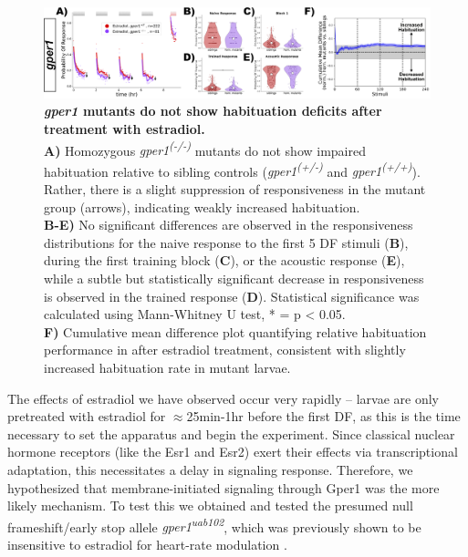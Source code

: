 \documentclass[9pt,lineno]{RandlettLab_elife}
\begin{document}
{\begin{figure}
\begin{fullwidth}
\begin{center}
\includegraphics[width=0.95\linewidth]{figures/gper1Mutants.png}
\caption{\textbf{\emph{gper1} mutants do not show habituation deficits after treatment with estradiol.}
\\ \textbf{A)} Homozygous \emph{gper1\textsuperscript{(-/-)}} mutants do not show impaired habituation relative to sibling controls (\emph{gper1\textsuperscript{(+/-)}} and \emph{gper1\textsuperscript{(+/+)}}). Rather, there is a slight suppression of responsiveness in the mutant group (arrows), indicating weakly increased habituation. 
\\ \textbf{B-E)} No significant differences are observed in the responsiveness distributions for the naive response to the first 5 DF stimuli (\textbf{B}), during the first training block (\textbf{C}), or the acoustic response (\textbf{E}), while a subtle but statistically significant decrease in responsiveness is observed in the trained response (\textbf{D}). Statistical significance was calculated using Mann-Whitney U test, * = p < 0.05.
\\ \textbf{F)} Cumulative mean difference plot quantifying relative habituation performance in  after estradiol treatment, consistent with slightly increased habituation rate in mutant larvae. 
}
\label{fig:2}

\end{center}
\end{fullwidth}
\end{figure}

The effects of estradiol we have observed occur very rapidly -- larvae are only pretreated with estradiol for $\approx$25min-1hr before the first DF, as this is the time necessary to set the apparatus and begin the experiment.
Since classical nuclear hormone receptors (like the Esr1 and Esr2) exert their effects via transcriptional adaptation, this necessitates a delay in signaling response. 
Therefore, we hypothesized that membrane-initiated signaling through Gper1 was the more likely mechanism. 
To test this we obtained and tested the presumed null frameshift/early stop allele \emph{gper1\textsuperscript{uab102}}, which was previously shown to be insensitive to estradiol for heart-rate modulation \citep{Romano2017-ep}. 

}
\end{document}

